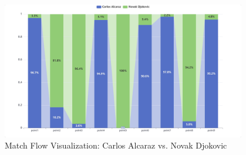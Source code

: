 \begin{figure}[htbp]
    \centering
    \includegraphics[width=0.95\textwidth]{figure/match_visual.png}
    \caption{Match Flow Visualization: Carlos Alcaraz vs. Novak Djokovic
    \textnormal{}}
    \label{fig:match_visual}
\end{figure}




